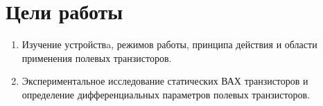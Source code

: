 \section{Цели работы}


\begin{enumerate}
  \item Изучение устройствa, режимов работы, принципа действия и области применения полевых транзисторов. 
  \item Экспериментальное исследование статических ВАХ транзисторов и определение дифференциальных параметров полевых транзисторов.
\end{enumerate}
